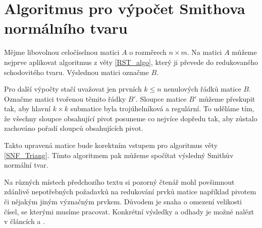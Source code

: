 \section{Algoritmus pro výpočet Smithova normálního tvaru}
Mějme libovolnou celočíselnou matici $ A $ o rozměrech $ n \times m $. Na matici
$ A $ můžeme nejprve aplikovat algoritmus z věty \ref{RST_algo}, který ji
převede do redukovaného schodovitého tvaru. Výslednou matici označme $ B $.

Pro další výpočty stačí uvažovat jen prvních $ k \leq n $ nenulových řádků
matice $ B $. Označme matici tvořenou těmito řádky $ B' $. Sloupce
matice $ B' $ můžeme přeskupit tak, aby hlavní $ k \times k $
submatice byla trojúhelníková a regulární. To uděláme tím, že všechny sloupce
obsahující pivot posuneme co nejvíce dopředu tak, aby zůstalo zachováno pořadí
sloupců obsahujících pivot.

Takto upravená matice bude korektním vstupem pro algoritmus věty
\ref{SNF_Triang}. Tímto algoritmem pak můžeme spočítat výsledný Smithův normální
tvar.

\begin{pozn}
Na různých místech předchozího textu si pozorný čtenář mohl povšimnout zdánlivě
nepotřebných požadavků na redukování prvků matice například pivotem či nějakým
jiným význačným prvkem. Důvodem je snaha o omezení velikosti čísel, se kterými
musíme pracovat. Konkrétní výsledky a odhady je možné nalézt v článcích
\cite{triang} a \cite{SNF_Arne}.
\end{pozn}
